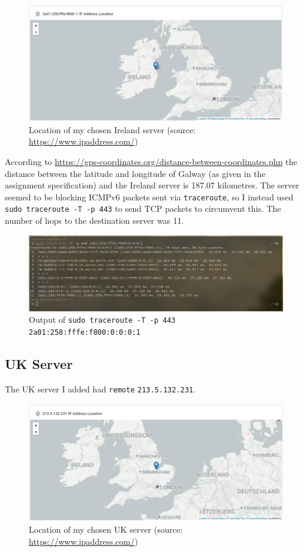 \documentclass[a4paper]{article}
\begin{document}
\begin{figure}[H]
    \centering
    \includegraphics[width=\textwidth]{./images/irelandserverloc.png}
    \caption{Location of my chosen Ireland server (source: \url{https://www.ipaddress.com/})}
\end{figure}

According to \url{https://gps-coordinates.org/distance-between-coordinates.php} the distance between the latitude and longitude of Galway (as given in the assignment specification) and the Ireland server is 187.07 kilometres.
The server seemed to be blocking ICMPv6 packets sent via \verb|traceroute|, so I instead used \texttt{sudo traceroute -T -p 443} to send TCP packets to circumvent this.
The number of hops to the destination server was 11.

\begin{figure}[H]
    \centering
    \includegraphics[width=\textwidth]{./images/irelandtraceroute.png}
    \caption{Output of \texttt{sudo traceroute -T -p 443 2a01:258:fffe:f800:0:0:0:1}}
\end{figure}

\subsection{UK Server}
The UK server I added had \verb|remote| \verb|213.5.132.231|.

\begin{figure}[H]
    \centering
    \includegraphics[width=\textwidth]{./images/ukserverloc.png}
    \caption{Location of my chosen UK server (source: \url{https://www.ipaddress.com/})}
\end{figure}
\end{document}
